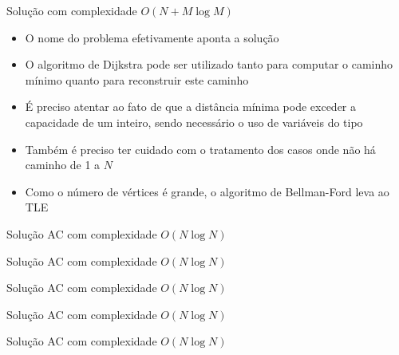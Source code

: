\begin{frame}[fragile]{Solução com complexidade $O(N + M\log M)$}

    \begin{itemize}
        \item O nome do problema efetivamente aponta a solução

        \item O algoritmo de Dijkstra pode ser utilizado tanto para computar o caminho
            mínimo quanto para reconstruir este caminho

        \item É preciso atentar ao fato de que a distância mínima pode exceder a capacidade
            de um inteiro, sendo necessário o uso de variáveis do tipo 

        \item Também é preciso ter cuidado com o tratamento dos casos onde não há caminho de
            1 a $N$

        \item Como o número de vértices é grande, o algoritmo de Bellman-Ford leva ao TLE
   \end{itemize}

\end{frame}

\begin{frame}[fragile]{Solução AC com complexidade $O(N\log N)$}
\end{frame}

\begin{frame}[fragile]{Solução AC com complexidade $O(N\log N)$}
\end{frame}

\begin{frame}[fragile]{Solução AC com complexidade $O(N\log N)$}
\end{frame}

\begin{frame}[fragile]{Solução AC com complexidade $O(N\log N)$}
\end{frame}

\begin{frame}[fragile]{Solução AC com complexidade $O(N\log N)$}
\end{frame}
